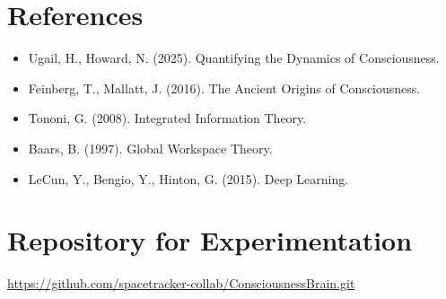 \documentclass[12pt]{article}
\begin{document}
\section{References}

\begin{itemize}
\item Ugail, H., Howard, N. (2025). Quantifying the Dynamics of Consciousness.
\item Feinberg, T., Mallatt, J. (2016). The Ancient Origins of Consciousness.
\item Tononi, G. (2008). Integrated Information Theory.
\item Baars, B. (1997). Global Workspace Theory.
\item LeCun, Y., Bengio, Y., Hinton, G. (2015). Deep Learning.
\end{itemize}

\section{Repository for Experimentation}

\noindent
\url{https://github.com/spacetracker-collab/ConsciousnessBrain.git}
\end{document}
